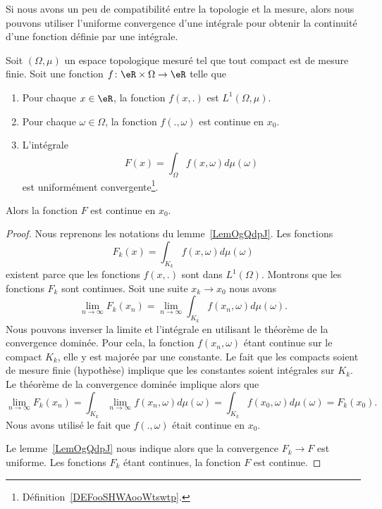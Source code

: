 Si nous avons un peu de compatibilité entre la topologie et la mesure, alors nous pouvons utiliser l'uniforme convergence d'une intégrale pour obtenir la continuité d'une fonction définie par une intégrale.

\begin{theorem} \label{ThotexmgE}
	Soit \( (\Omega,\mu)\) un espace topologique mesuré tel que tout compact est de mesure finie. Soit une fonction \( f\colon \eR\times \Omega\to \eR\) telle que
	\begin{enumerate}
		\item
		      Pour chaque \( x\in \eR\), la fonction \( f(x,.)\) est \( L^1(\Omega,\mu)\).
		\item
		      Pour chaque \( \omega\in \Omega\), la fonction \( f(.,\omega)\) est continue en \( x_0\).
		\item
		      L'intégrale
		      \begin{equation}
			      F(x)=\int_{\Omega}f(x,\omega)d\mu(\omega)
		      \end{equation}
		      est uniformément convergente\footnote{Définition~\ref{DEFooSHWAooWtswtp}.}.
	\end{enumerate}
	Alors la fonction \( F\) est continue en \( x_0\).
\end{theorem}

\begin{proof}
	Nous reprenons les notations du lemme~\ref{LemOgQdpJ}. Les fonctions
	\begin{equation}
		F_k(x)=\int_{K_k}f(x,\omega)d\mu(\omega)
	\end{equation}
	existent parce que les fonctions \( f(x,.)\) sont dans \( L^1(\Omega)\). Montrons que les fonctions \( F_k\) sont continues. Soit une suite \( x_k\to x_0\) nous avons
	\begin{equation}
		\lim_{n\to \infty} F_k(x_n)=\lim_{n\to \infty} \int_{K_k}f(x_n,\omega)d\mu(\omega).
	\end{equation}
	Nous pouvons inverser la limite et l'intégrale en utilisant le théorème de la convergence dominée. Pour cela, la fonction \( f(x_n,\omega)\) étant continue sur le compact \( K_k\), elle y est majorée par une constante. Le fait que les compacts soient de mesure finie (hypothèse) implique que les constantes soient intégrales sur \( K_k\). Le théorème de la convergence dominée implique alors que
	\begin{equation}
		\lim_{n\to \infty} F_k(x_n)=\int_{K_k}\lim_{n\to \infty} f(x_n,\omega)d\mu(\omega)=\int_{K_k}f(x_0,\omega)d\mu(\omega)=F_k(x_0).
	\end{equation}
	Nous avons utilisé le fait que \( f(.,\omega)\) était continue en \( x_0\).

	Le lemme~\ref{LemOgQdpJ} nous indique alors que la convergence \( F_k\to F\) est uniforme. Les fonctions \( F_k\) étant continues, la fonction \( F\) est continue.
\end{proof}


